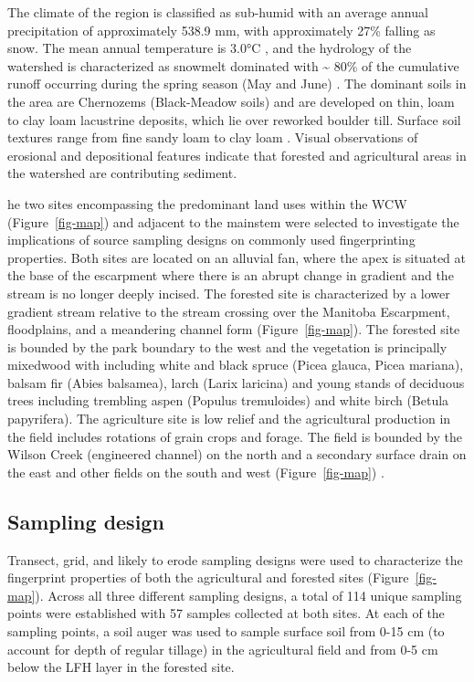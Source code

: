 \documentclass[
  number]{elsarticle}
\begin{document}
The climate of the region is classified as sub-humid with an average
annual precipitation of approximately 538.9 mm, with approximately 27\%
falling as snow. The mean annual temperature is 3.0°C \citep[1981--2010
climate normals,][]{environmentandclimatechangecanada2024}, and the
hydrology of the watershed is characterized as snowmelt dominated with
\textasciitilde{} 80\% of the cumulative runoff occurring during the
spring season (May and June) \citep{mackay1970}. The dominant soils in
the area are Chernozems (Black-Meadow soils) and are developed on thin,
loam to clay loam lacustrine deposits, which lie over reworked boulder
till. Surface soil textures range from fine sandy loam to clay loam
\citep{ehrlich1958}. Visual observations of erosional and depositional
features indicate that forested and agricultural areas in the watershed
are contributing sediment.

he two sites encompassing the predominant land uses within the WCW
(Figure~\ref{fig-map}) and adjacent to the mainstem were selected to
investigate the implications of source sampling designs on commonly used
fingerprinting properties. Both sites are located on an alluvial fan,
where the apex is situated at the base of the escarpment where there is
an abrupt change in gradient and the stream is no longer deeply incised.
The forested site is characterized by a lower gradient stream relative
to the stream crossing over the Manitoba Escarpment, floodplains, and a
meandering channel form \citep{mcginn1979} (Figure~\ref{fig-map}). The
forested site is bounded by the park boundary to the west and the
vegetation is principally mixedwood with including white and black
spruce (Picea glauca, Picea mariana), balsam fir (Abies balsamea), larch
(Larix laricina) and young stands of deciduous trees including trembling
aspen (Populus tremuloides) and white birch (Betula papyrifera). The
agriculture site is low relief and the agricultural production in the
field includes rotations of grain crops and forage. The field is bounded
by the Wilson Creek (engineered channel) on the north and a secondary
surface drain on the east and other fields on the south and west
(Figure~\ref{fig-map}) \citep{mcginn1979}.

\subsection{Sampling design}\label{sampling-design}

Transect, grid, and likely to erode sampling designs were used to
characterize the fingerprint properties of both the agricultural and
forested sites (Figure~\ref{fig-map}). Across all three different
sampling designs, a total of 114 unique sampling points were established
with 57 samples collected at both sites. At each of the sampling points,
a soil auger was used to sample surface soil from 0-15 cm (to account
for depth of regular tillage) in the agricultural field and from 0-5 cm
below the LFH layer in the forested site.
\end{document}
